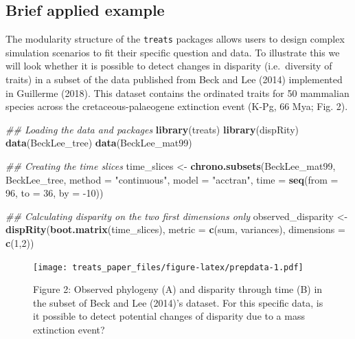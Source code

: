 \documentclass[
]{article}
\newenvironment{Shaded}{\begin{snugshade}}{\end{snugshade}}
\newcommand{\CommentTok}[1]{\textcolor[rgb]{0.56,0.35,0.01}{\textit{#1}}}
\newcommand{\DataTypeTok}[1]{\textcolor[rgb]{0.13,0.29,0.53}{#1}}
\newcommand{\DecValTok}[1]{\textcolor[rgb]{0.00,0.00,0.81}{#1}}
\newcommand{\KeywordTok}[1]{\textcolor[rgb]{0.13,0.29,0.53}{\textbf{#1}}}
\newcommand{\NormalTok}[1]{#1}
\newcommand{\StringTok}[1]{\textcolor[rgb]{0.31,0.60,0.02}{#1}}
\begin{document}
\hypertarget{brief-applied-example}{%
\subsection{Brief applied example}\label{brief-applied-example}}

The modularity structure of the \texttt{treats} packages allows users to
design complex simulation scenarios to fit their specific question and
data. To illustrate this we will look whether it is possible to detect
changes in disparity (i.e.~diversity of traits) in a subset of the data
published from Beck and Lee (2014) implemented in Guillerme (2018). This
dataset contains the ordinated traits for 50 mammalian species across
the cretaceous-palaeogene extinction event (K-Pg, 66 Mya; Fig. 2).

\begin{Shaded}
\begin{Highlighting}[]
\CommentTok{\#\# Loading the data and packages}
\KeywordTok{library}\NormalTok{(treats)}
\KeywordTok{library}\NormalTok{(dispRity)}
\KeywordTok{data}\NormalTok{(BeckLee\_tree)}
\KeywordTok{data}\NormalTok{(BeckLee\_mat99)}

\CommentTok{\#\# Creating the time slices}
\NormalTok{time\_slices \textless{}{-}}\StringTok{ }\KeywordTok{chrono.subsets}\NormalTok{(BeckLee\_mat99, BeckLee\_tree,}
                              \DataTypeTok{method =} \StringTok{"continuous"}\NormalTok{,}
                              \DataTypeTok{model  =} \StringTok{"acctran"}\NormalTok{,}
                              \DataTypeTok{time   =} \KeywordTok{seq}\NormalTok{(}\DataTypeTok{from =} \DecValTok{96}\NormalTok{, }\DataTypeTok{to =} \DecValTok{36}\NormalTok{, }\DataTypeTok{by =} \DecValTok{{-}10}\NormalTok{))}

\CommentTok{\#\# Calculating disparity on the two first dimensions only}
\NormalTok{observed\_disparity \textless{}{-}}\StringTok{ }\KeywordTok{dispRity}\NormalTok{(}\KeywordTok{boot.matrix}\NormalTok{(time\_slices),}
                               \DataTypeTok{metric =} \KeywordTok{c}\NormalTok{(sum, variances),}
                               \DataTypeTok{dimensions =} \KeywordTok{c}\NormalTok{(}\DecValTok{1}\NormalTok{,}\DecValTok{2}\NormalTok{))}
\end{Highlighting}
\end{Shaded}

\begin{figure}
\centering
\texttt{[image: treats\_paper\_files/figure-latex/prepdata-1.pdf]}
\caption{Figure 2: Observed phylogeny (A) and disparity through time (B)
in the subset of Beck and Lee (2014)'s dataset. For this specific data,
is it possible to detect potential changes of disparity due to a mass
extinction event?}
\end{figure}
\end{document}
